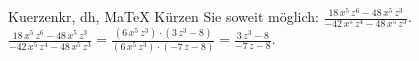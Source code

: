 \begin{MAufgabe}{Kuerzen}{kr, dh, MaTeX}
K\"urzen Sie soweit m\"oglich: $\frac{18\, x^5\, z^6 - 48\, x^5\, z^3}{ - 42\, x^5\, z^4 - 48\, x^5\, z^3}$.\\ 
\ifLsg\MLoesung
\quad $\frac{18\, x^5\, z^6 - 48\, x^5\, z^3}{ - 42\, x^5\, z^4 - 48\, x^5\, z^3}=\frac{(6\, x^5\, z^3)\cdot(3\, z^3 - 8)}{(6\, x^5\, z^3)\cdot( - 7\, z - 8)}=\frac{3\, z^3 - 8}{ - 7\, z - 8}$.\else\relax\fi
 \end{MAufgabe}